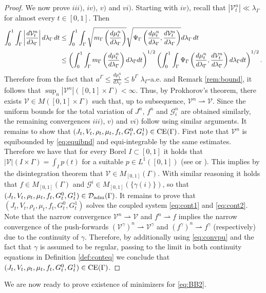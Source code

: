 \documentclass{article}
\begin{document}
\begin{proof}
     We now prove $iii)$, $iv)$, $v)$ and $vi)$. 
    Starting with $iv)$, recall that $|\mathcal{V}_t^n| \ll \lambda_\Gamma$ for almost every $t \in [0,1]$. Then 
    \begin{align}
        \int_0^1 \int_\Gamma \left|\frac{d\mathcal{V}^n_t}{d\lambda_\Gamma}\right| d \lambda_\Gamma\, dt &\leq \int_0^1 \int_\Gamma \sqrt{m_\Gamma\left(\frac{d\mu^n_{t}}{d\lambda_\Gamma}\right)}\sqrt{\Psi_\Gamma\left(\frac{d\mu^n_{t}}{d\lambda_\Gamma}, \frac{d\mathcal{V}^n_{t}}{d\lambda_\Gamma} \right)}d\lambda_\Gamma\, dt \notag\\
        & \leq \left(\int_0^1 \int_\Gamma  m_\Gamma\left(\frac{d\mu^n_{t}}{d\lambda_\Gamma}\right) d\lambda_\Gamma dt\right)^{1/2}
       \left(\int_0^1 \int_\Gamma  \Psi_\Gamma\left(\frac{d\mu^n_{t}}{d\lambda_\Gamma}, \frac{d\mathcal{V}^n_{t}}{d\lambda_\Gamma} \right) d\lambda_\Gamma dt\right)^{1/2}. \label{eq:equibnd}
    \end{align}
   Therefore from the fact that $a^\Gamma\leq \frac{d\mu^n_{t}}{d\lambda_\Gamma} \leq b^\Gamma$ $\lambda_\Gamma$-a.e. and Remark \ref{rem:bound}, it follows that $\sup_n |\mathcal{V}^n|([0,1]\times\Gamma) <\infty$. Thus, by Prokhorov's theorem, there exists $\mathcal{V} \in M([0,1]\times\Gamma)$ such that, up to subsequence, $\mathcal{V}^n \rightharpoonup \mathcal{V}$. Since the uniform bounds for the total variation of $J^n$, $f^n$ and $\mathcal{G}_i^n$ are obtained similarly, the remaining convergences $iii)$, $v)$ and $vi)$ follow using similar arguments. It remains to show that $(J_t,V_t,\rho_t,\mu_t,f_t, G_t^0,G_t^1) \in {\rm CE}(\Gamma)$. First note that $\mathcal{V}^n$ is equibounded by \eqref{eq:equibnd} and equi-integrable by the same estimates. Therefore we have that 
   for every Borel $I \subset [0,1]$ it holds that $|\mathcal{V}|(I\times \Gamma) = \int_{I} p(t)$ for a suitable $p\in L^1([0,1])$ (see \cite[Lemma 4.5]{Dolbeault_2008} or \cite[Theorem 8.1]{gamkrelidze2013principles}).  
   This implies by the disintegration theorem \cite[Theorem 2.28]{ambrosio2000functions} that $\mathcal{V} \in M_{[0,1]}(\Gamma)$.
   With similar reasoning it holds that $f \in M_{[0,1]}(\Gamma)$ and $\mathcal{G}^i \in M_{[0,1]}(\{\gamma(i)\})$, so that $(J_t,V_t,\rho_t,\mu_t,f_t, G_t^0,G_t^1) \in \mathcal{D}_{\rm adm}(\Gamma)$.   
  It remains to prove that $(J_t,V_t,\rho_t,\mu_t,f_t, G_t^0,G_t^1)$ solves the coupled system \eqref{eq:cont1} and \eqref{eq:cont2}. Note that the narrow convergence $\mathcal{V}^n \rightharpoonup \mathcal{V}$ and $f^n \rightharpoonup f$ implies the narrow convergence of the push-forwards $(\mathcal{V}^\gamma)^n \rightharpoonup \mathcal{V}^\gamma$ and $(f^\gamma)^n \rightharpoonup f^\gamma$ (respectively) due to the continuity of $\gamma$. Therefore, by additionally using \eqref{eq:convpu} and the fact that $\gamma$ is assumed to be regular, passing to the limit in both continuity equations in Definition \ref{def:conteq} we conclude that $(J_t,V_t,\rho_t,\mu_t,f_t, G_t^0,G_t^1) \in \rm CE(\Gamma)$. 
\end{proof}
We are now ready to prove existence of minimizers for \eqref{eq:BB2}.
\end{document}
